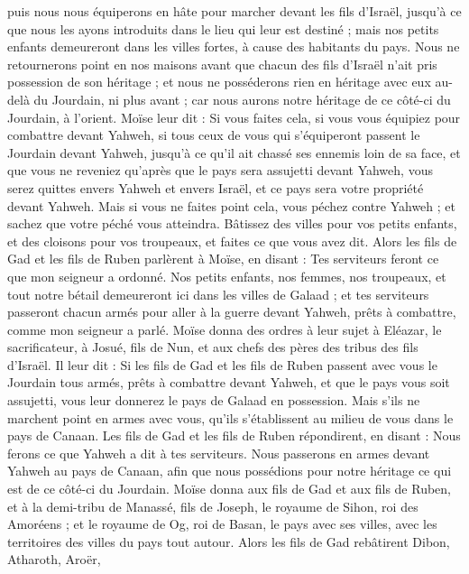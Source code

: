 \begin{multicols}{2}
puis nous nous équiperons en hâte pour marcher devant les fils d'Israël, jusqu'à ce que nous les ayons introduits dans le lieu qui leur est destiné ; mais nos petits enfants demeureront dans les villes fortes, à cause des habitants du pays.
Nous ne retournerons point en nos maisons avant que chacun des fils d'Israël n'ait pris possession de son héritage ;
et nous ne posséderons rien en héritage avec eux au-delà du Jourdain, ni plus avant ; car nous aurons notre héritage de ce côté-ci du Jourdain, à l'orient.
Moïse leur dit : Si vous faites cela, si vous vous équipiez pour combattre devant Yahweh,
si tous ceux de vous qui s'équiperont passent le Jourdain devant Yahweh, jusqu'à ce qu'il ait chassé ses ennemis loin de sa face,
et que vous ne reveniez qu'après que le pays sera assujetti devant Yahweh, vous serez quittes envers Yahweh et envers Israël, et ce pays sera votre propriété devant Yahweh.
Mais si vous ne faites point cela, vous péchez contre Yahweh ; et sachez que votre péché vous atteindra.
Bâtissez des villes pour vos petits enfants, et des cloisons pour vos troupeaux, et faites ce que vous avez dit.
Alors les fils de Gad et les fils de Ruben parlèrent à Moïse, en disant : Tes serviteurs feront ce que mon seigneur a ordonné.
Nos petits enfants, nos femmes, nos troupeaux, et tout notre bétail demeureront ici dans les villes de Galaad ;
et tes serviteurs passeront chacun armés pour aller à la guerre devant Yahweh, prêts à combattre, comme mon seigneur a parlé.
Moïse donna des ordres à leur sujet à Eléazar, le sacrificateur, à Josué, fils de Nun, et aux chefs des pères des tribus des fils d'Israël.
Il leur dit : Si les fils de Gad et les fils de Ruben passent avec vous le Jourdain tous armés, prêts à combattre devant Yahweh, et que le pays vous soit assujetti, vous leur donnerez le pays de Galaad en possession.
Mais s'ils ne marchent point en armes avec vous, qu'ils s'établissent au milieu de vous dans le pays de Canaan.
Les fils de Gad et les fils de Ruben répondirent, en disant : Nous ferons ce que Yahweh a dit à tes serviteurs.
Nous passerons en armes devant Yahweh au pays de Canaan, afin que nous possédions pour notre héritage ce qui est de ce côté-ci du Jourdain.
Moïse donna aux fils de Gad et aux fils de Ruben, et à la demi-tribu de Manassé, fils de Joseph, le royaume de Sihon, roi des Amoréens ; et le royaume de Og, roi de Basan, le pays avec ses villes, avec les territoires des villes du pays tout autour.
Alors les fils de Gad rebâtirent Dibon, Atharoth, Aroër,

\end{multicols}
